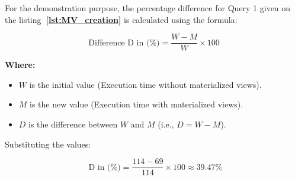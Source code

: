 For the demonstration purpose, the percentage difference for Query 1 given on the listing\textbf{~\ref{lst:MV_creation}} is calculated using the formula:

\begin{equation}
\text{Difference D in  (\%)} = \frac{W - M}{W} \times 100
\end{equation}

\noindent \textbf{Where:}
\begin{itemize}
    \item \( W \) is the initial value (Execution time without materialized views).
    \item \( M \) is the new value (Execution time with materialized views).
    \item \( D \) is the difference between \( W \) and \( M \) (i.e., \( D = W - M \)).
\end{itemize}

Substituting the values:

\[
\text{ D in (\%)} = \frac{114 - 69}{114} \times 100 \approx 39.47\%
\]